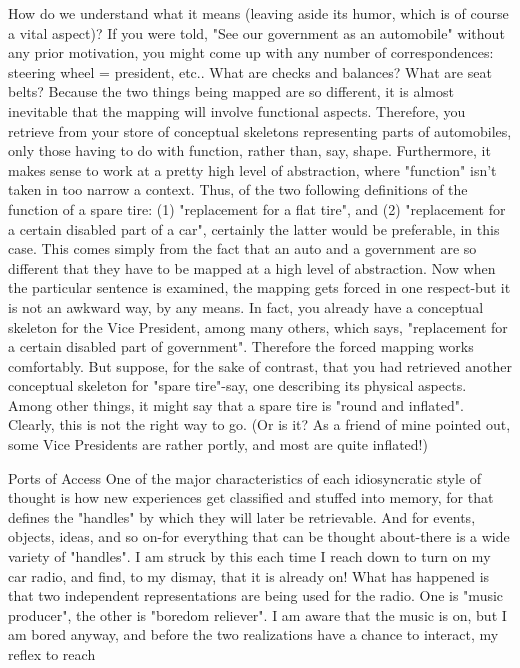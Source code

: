 How do we understand what it means (leaving aside its humor, which is of course a vital
aspect)? If you were told, "See our government as an automobile" without any prior
motivation, you might come up with any number of correspondences: steering wheel =
president, etc.. What are checks and balances? What are seat belts? Because the two
things being mapped are so different, it is almost inevitable that the mapping will involve
functional aspects. Therefore, you retrieve from your store of conceptual skeletons
representing parts of automobiles, only those having to do with function, rather than, say,
shape. Furthermore, it makes sense to work at a pretty high level of abstraction, where
"function" isn't taken in too narrow a context. Thus, of the two following definitions of
the function of a spare tire: (1) "replacement for a flat tire", and (2) "replacement for a
certain disabled part of a car", certainly the latter would be preferable, in this case. This
comes simply from the fact that an auto and a government are so different that they have
to be mapped at a high level of abstraction.
        Now when the particular sentence is examined, the mapping gets forced in one
respect-but it is not an awkward way, by any means. In fact, you already have a
conceptual skeleton for the Vice President, among many others, which says,
"replacement for a certain disabled part of government". Therefore the forced mapping
works comfortably. But suppose, for the sake of contrast, that you had retrieved another
conceptual skeleton for "spare tire"-say, one describing its physical aspects. Among other
things, it might say that a spare tire is "round and inflated". Clearly, this is not the right
way to go. (Or is it? As a friend of mine pointed out, some Vice Presidents are rather
portly, and most are quite inflated!)

                                     Ports of Access
One of the major characteristics of each idiosyncratic style of thought is how new
experiences get classified and stuffed into memory, for that defines the "handles" by
which they will later be retrievable. And for events, objects, ideas, and so on-for
everything that can be thought about-there is a wide variety of "handles". I am struck by
this each time I reach down to turn on my car radio, and find, to my dismay, that it is
already on! What has happened is that two independent representations are being used for
the radio. One is "music producer", the other is "boredom reliever". I am aware that the
music is on, but I am bored anyway, and before the two realizations have a chance to
interact, my reflex to reach




